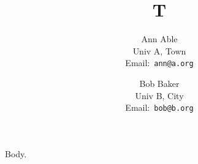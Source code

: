 \documentclass{article}
\newcommand{\email}[1]{{\normalfont Email:~\texttt{#1}}}
\begin{document}
\title{T}
\author{Ann Able\\ Univ A, Town\\ \email{ann@a.org} \and Bob Baker\\ Univ B, City\\ \email{bob@b.org}}
\maketitle
Body.
\end{document}
